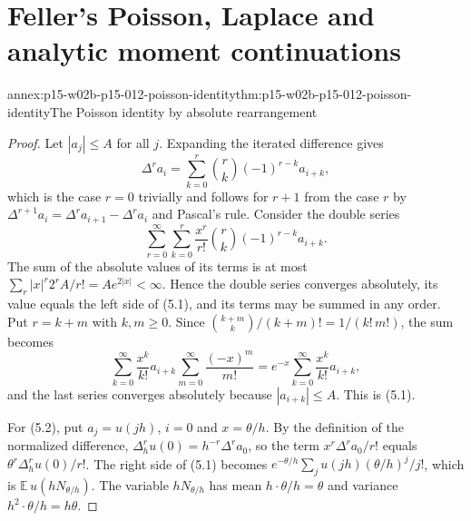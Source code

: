 \section{Feller's Poisson, Laplace and analytic moment continuations}
\label{sec:annex-p15-w02b-p15-012-feller-continuations}

\begin{annexitem}{annex:p15-w02b-p15-012-poisson-identity}{thm:p15-w02b-p15-012-poisson-identity}{The Poisson identity by absolute rearrangement}
\begin{proof}
Let \(|a_j|\leq A\) for all \(j\). Expanding the iterated difference gives
\[
 \Delta^r a_i=\sum_{k=0}^r\binom rk(-1)^{r-k}a_{i+k},
\]
which is the case \(r=0\) trivially and follows for \(r+1\) from the case
\(r\) by \(\Delta^{r+1}a_i=\Delta^ra_{i+1}-\Delta^ra_i\) and Pascal's rule.
Consider the double series
\[
 \sum_{r=0}^\infty\sum_{k=0}^r\frac{x^r}{r!}\binom rk(-1)^{r-k}a_{i+k}.
\]
The sum of the absolute values of its terms is at most
\(\sum_r|x|^r2^rA/r!=Ae^{2|x|}<\infty\). Hence the double series converges
absolutely, its value equals the left side of (5.1), and its terms may be
summed in any order. Put \(r=k+m\) with \(k,m\geq0\). Since
\(\binom{k+m}k/(k+m)!=1/(k!\,m!)\), the sum becomes
\[
 \sum_{k=0}^\infty\frac{x^k}{k!}a_{i+k}\sum_{m=0}^\infty\frac{(-x)^m}{m!}
     =e^{-x}\sum_{k=0}^\infty\frac{x^k}{k!}a_{i+k},
\]
and the last series converges absolutely because \(|a_{i+k}|\leq A\). This is
(5.1).

For (5.2), put \(a_j=u(jh)\), \(i=0\) and \(x=\theta/h\). By the definition of
the normalized difference, \(\Delta_h^ru(0)=h^{-r}\Delta^ra_0\), so the term
\(x^r\Delta^ra_0/r!\) equals \(\theta^r\Delta_h^ru(0)/r!\). The right side of
(5.1) becomes \(e^{-\theta/h}\sum_ju(jh)(\theta/h)^j/j!\), which is
\(\mathbb E\,u(hN_{\theta/h})\). The variable \(hN_{\theta/h}\) has mean
\(h\cdot\theta/h=\theta\) and variance \(h^2\cdot\theta/h=h\theta\).
\end{proof}
\end{annexitem}

